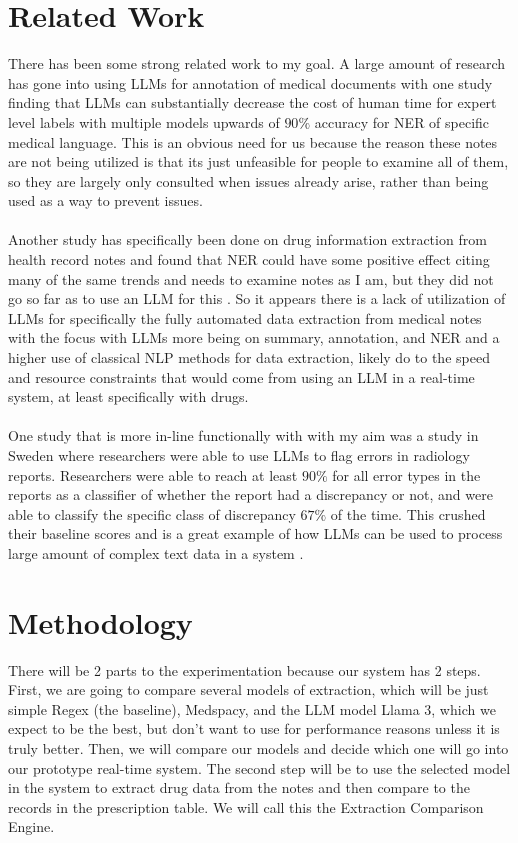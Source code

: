 \documentclass[sigconf,nonacm]{acmart} %
\begin{document}
\section{Related Work}
There has been some strong related work to my goal. A large amount of research has gone into using LLMs for annotation of medical documents with one study finding that LLMs can substantially decrease the cost of human time for expert level labels with multiple models upwards of $90\%$ accuracy for NER of specific medical language\cite{goel}. This is an obvious need for us because the reason these notes are not being utilized is that its just unfeasible for people to examine all of them, so they are largely only consulted when issues already arise, rather than being used as a way to prevent issues.
\\\\Another study has specifically been done on drug information extraction from health record notes and found that NER could have some positive effect citing many of the same trends and needs to examine notes as I am, but they did not go so far as to use an LLM for this \cite{jagg}. So it appears there is a lack of utilization of LLMs for specifically the fully automated data extraction from medical notes with the focus with LLMs more being on summary, annotation, and NER and a higher use of classical NLP methods for data extraction, likely do to the speed and resource constraints that would come from using an LLM in a real-time system, at least specifically with drugs.
\\\\One study that is more in-line functionally with with my aim was a study in Sweden where researchers were able to use LLMs to flag errors in radiology reports. Researchers were able to reach at least $90\%$ for all error types in the reports as a classifier of whether the report had a discrepancy or not, and were able to classify the specific class of discrepancy $67\%$ of the time. This crushed their baseline scores and is a great example of how LLMs can be used to process large amount of complex text data in a system \cite{alfons}.

\section{Methodology}
There will be 2 parts to the experimentation because our system has 2 steps. First, we are going to compare several models of extraction, which will be just simple Regex (the baseline), Medspacy, and the LLM model Llama 3, which we expect to be the best, but don't want to use for performance reasons unless it is truly better. Then, we will compare our models and decide which one will go into our prototype real-time system. The second step will be to use the selected model in the system to extract drug data from the notes and then compare to the records in the prescription table. We will call this the Extraction Comparison Engine.
\end{document}
